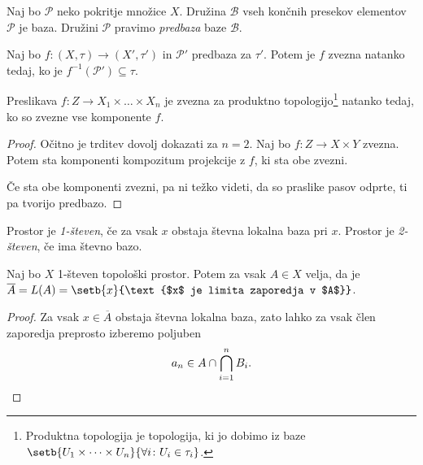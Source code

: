 \obvs

\begin{definicija}
Naj bo $\mathcal{P}$ neko pokritje množice $X$. Družina
$\mathcal{B}$ vseh končnih presekov elementov $\mathcal{P}$ je
baza. Družini $\mathcal{P}$ pravimo
\emph{predbaza} baze $\mathcal{B}$.
\end{definicija}

\begin{trditev}
Naj bo $f \colon (X,\tau) \to (X',\tau')$ in $\mathcal{P}'$
predbaza za $\tau'$. Potem je $f$ zvezna natanko tedaj, ko je
$f^{-1}(\mathcal{P}') \subseteq \tau$.
\end{trditev}

\obvs

\begin{trditev}
Preslikava $f \colon Z \to X_1 \times \dots \times X_n$ je zvezna
za produktno topologijo\footnote{Produktna topologija je
topologija, ki jo dobimo iz baze
$\setb{U_1 \times \dots \times U_n}
{\forall i \colon U_i \in \tau_i}$.}
natanko tedaj, ko so zvezne vse komponente
$f$.
\end{trditev}

\begin{proof}
Očitno je trditev dovolj dokazati za $n=2$. Naj bo
$f \colon Z \to X \times Y$ zvezna. Potem sta komponenti kompozitum
projekcije z $f$, ki sta obe zvezni.

Če sta obe komponenti zvezni, pa ni težko videti, da so praslike
pasov odprte, ti pa tvorijo predbazo.
\end{proof}

\begin{definicija}
Prostor je \emph{1-števen},
če za vsak $x$ obstaja števna lokalna baza pri $x$. Prostor je
\emph{2-števen}, če ima števno bazo.
\end{definicija}

\begin{trditev}
Naj bo $X$ 1-števen topološki prostor. Potem za vsak $A \in X$
velja, da je $\overline{A} = L(A) =
\setb{x}{\text{$x$ je limita zaporedja v $A$}}$.
\end{trditev}

\begin{proof}
Za vsak $x \in \overline{A}$ obstaja števna lokalna baza, zato
lahko za vsak člen zaporedja preprosto izberemo poljuben
\[
a_n \in A \cap \bigcap_{i=1}^n B_i. \qedhere
\]
\end{proof}

